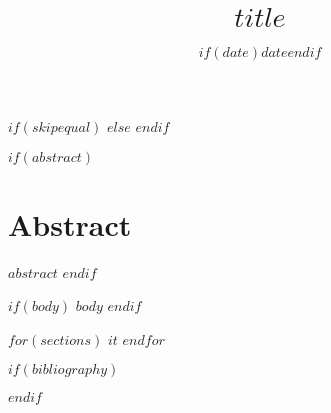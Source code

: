 \documentclass[%
  letterpaper,%
  $if(lang)$$lang$$else$english$endif$%
]{article}
\title{\vspace{-5ex} $title$}
\date{$if(date)$$date$$endif$}
\begin{document}
\setnowidow[2]
\maketitle

$if(skipequal)$
$else$
$endif$

$if(abstract)$
\section*{Abstract}
$abstract$
$endif$

$if(body)$
$body$
$endif$

$for(sections)$
$it$
$endfor$

$if(bibliography)$
\clearpage


$endif$


\end{document}
